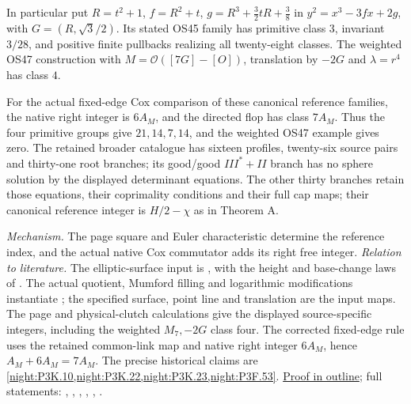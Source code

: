 In particular put $R=t^2+1$, $f=R^2+t$,
$g=R^3+\tfrac32tR+\tfrac38$ in
$y^2=x^3-3fx+2g$, with $G=(R,\sqrt3/2)$.
Its stated OS45 family has primitive class $3$, invariant $3/28$,
and positive finite pullbacks realizing all twenty-eight classes.
The weighted OS47 construction with $M=\mathcal O([7G]-[O])$,
translation by $-2G$ and $\lambda=r^4$ has class $4$.

For the actual fixed-edge Cox comparison of these canonical reference
families, the native right integer is $6A_M$, and the directed flop
has class $7A_M$. Thus the four primitive groups give
$21,14,7,14$, and the weighted OS47 example gives zero.
The retained broader catalogue has sixteen profiles, twenty-six source
pairs and thirty-one root branches; its good/good $III^*+II$ branch
has no sphere solution by the displayed determinant equations.
The other thirty branches retain those equations, their coprimality
conditions and their full cap maps; their canonical reference integer
is $H/2-\chi$ as in Theorem A.

\textit{Mechanism.} The page square and Euler characteristic determine the reference
index, and the actual native Cox commutator adds its right free integer.
\textit{Relation to literature.} The elliptic-surface input is \cite[Main Theorem, pp.~85--86]{OguisoShioda1991}, with the height and base-change laws of \cite[Theorem~8.6 and Proposition~8.12, pp.~228--231]{Shioda1990}. The actual quotient, Mumford filling and logarithmic modifications instantiate \cite[Section~2 and Remark~8.5]{Engel2026}; the specified surface, point line and translation are the input maps. The page and physical-clutch calculations give the displayed source-specific integers, including the weighted $M_7,-2G$ class four. The corrected fixed-edge rule uses the retained common-link map and native right integer $6A_M$, hence $A_M+6A_M=7A_M$. The precise historical claims are \cref{night:P3K.10,night:P3K.22,night:P3K.23,night:P3F.53}.
\hyperlink{outline-IV-B}{Proof in outline}; full statements: , , , , , .

\hypertarget{main-IV-C}{}
